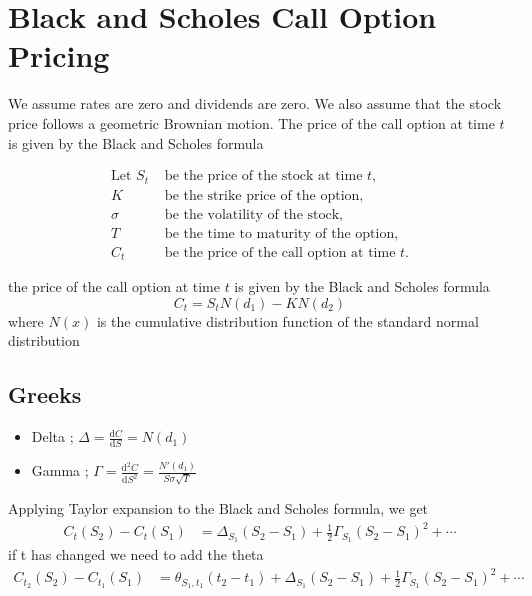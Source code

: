 \documentclass[12pt]{article}
\newcommand{\der}[2]{\frac{\mathrm{d}{#1}}{\mathrm{d}{#2}}}
\begin{document}
\section{Black and Scholes Call Option Pricing}
We assume rates are zero and dividends are zero. We also assume that the stock price follows a geometric Brownian motion. The price of the call option at time $t$ is given by the Black and Scholes formula
\begin{fleqn}
\begin{equation}
\begin{aligned}
\text{Let } S_t &\text{ be the price of the stock at time } t,\\
K &\text{ be the strike price of the option,}\\
\sigma &\text{ be the volatility of the stock,}\\
T &\text{ be the time to maturity of the option,}\\
C_t &\text{ be the price of the call option at time } t.
\end{aligned}
\end{equation}
\end{fleqn}
the price of the call option at time $t$ is given by the Black and Scholes formula
\[\boxed{C_t = S_tN(d_1) - KN(d_2)}\]
where $N(x)$ is the cumulative distribution function of the standard normal distribution
\subsection{Greeks}
\begin{itemize}
\item Delta ; $\Delta = \der{C}{S}=N(d_1)$
\item Gamma ; $\Gamma = \der{^2C}{S^2}=\frac{N'(d_1)}{S\sigma\sqrt{T}}$
\end{itemize}
Applying Taylor expansion to the Black and Scholes formula, we get
\begin{equation}
\begin{aligned}
C_t(S_2) -C_t(S_1) &= \Delta_{S_1}(S_2-S_1) + \frac{1}{2}\Gamma_{S_1}(S_2-S_1)^2 + \cdots
\end{aligned}
\end{equation}
if t has changed we need to add the theta
\begin{equation}
\begin{aligned}
C_{t_2}(S_2) -C_{t_1}(S_1) &=  \theta_{S_1,t_1}(t_2-t_1) +\Delta_{S_1}(S_2-S_1) + \frac{1}{2}\Gamma_{S_1}(S_2-S_1)^2 + \cdots
\end{aligned}
\end{equation}
\end{document}

